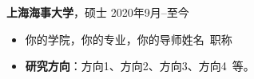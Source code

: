 \documentclass[11pt]{article}
\begin{document}
\begin{minipage}[t]{0.78\textwidth}
\begin{minipage}[t]{\textwidth}
        \vspace{0.5em}
        {\large \textbf{上海海事大学}}，硕士 \hfill 2020年9月--至今
        \begin{itemize}
            \item 你的学院，你的专业，你的导师姓名\ 职称
            \item \textbf{研究方向}：方向1、方向2、方向3、方向4\ 等。
        \end{itemize}
        
        \vspace{1.2em}
        \end{minipage}
    \end{minipage}
    \hfill
    \begin{minipage}[t]{0.2\textwidth}
        \vspace{2em} %
        \setlength{\fboxsep}{0pt}
    \end{minipage}
\end{document}
